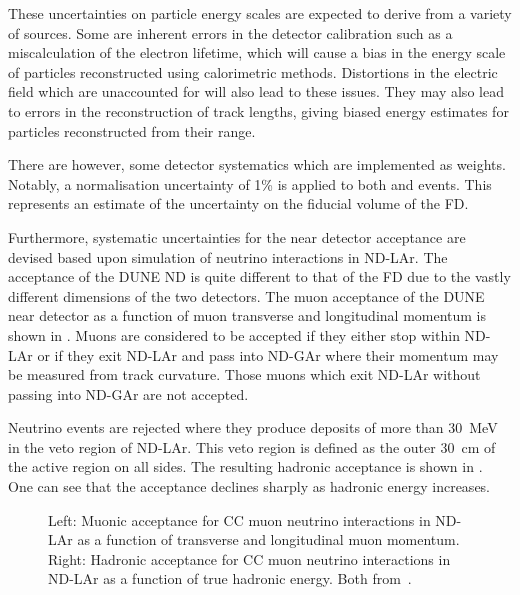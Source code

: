 These uncertainties on particle energy scales are expected to derive from a variety of sources.
Some are inherent errors in the detector calibration such as a miscalculation of the electron lifetime, which will cause a bias in the energy scale of particles reconstructed using calorimetric methods.
Distortions in the electric field which are unaccounted for will also lead to these issues. 
They may also lead to errors in the reconstruction of track lengths, giving biased energy estimates for particles reconstructed from their range.

There are however, some detector systematics which are implemented as weights. 
Notably, a normalisation uncertainty of 1\% is applied to both \numu and \nue events.
This represents an estimate of the uncertainty on the fiducial volume of the FD.

Furthermore, systematic uncertainties for the near detector acceptance are devised based upon simulation of neutrino interactions in ND-LAr.
The acceptance of the DUNE ND is quite different to that of the FD due to the vastly different dimensions of the two detectors.
The muon acceptance of the DUNE near detector as a function of muon transverse and longitudinal momentum is shown in . 
Muons are considered to be accepted if they either stop within ND-LAr or if they exit ND-LAr and pass into ND-GAr where their momentum may be measured from track curvature.
Those muons which exit ND-LAr without passing into ND-GAr are not accepted.

Neutrino events are rejected where they produce deposits of more than \SI{30}{\MeV} in the veto region of ND-LAr.
This veto region is defined as the outer \SI{30}{\cm} of the active region on all sides.
The resulting hadronic acceptance is shown in .
One can see that the acceptance declines sharply as hadronic energy increases.

\begin{figure}[h]
	\begin{minipage}[t]{.5\textwidth}
		\begin{adjustbox}{max totalsize=\linewidth, center}
			
		\end{adjustbox}
	\end{minipage}
	\hfill
	\begin{minipage}[t]{.5\textwidth}
		\begin{adjustbox}{max totalsize=\linewidth, center}
			
		\end{adjustbox}
	\end{minipage}
	\caption[Muonic and hadronic acceptance for CC neutrino interactions in ND-LAr]{Left: Muonic acceptance for CC muon neutrino interactions in ND-LAr as a function of transverse and longitudinal muon momentum. Right: Hadronic acceptance for CC muon neutrino interactions in ND-LAr as a function of true hadronic energy. Both from~\cite{Abi:2020qib}.}
	\label{fig:ndAcceptance}
\end{figure}

